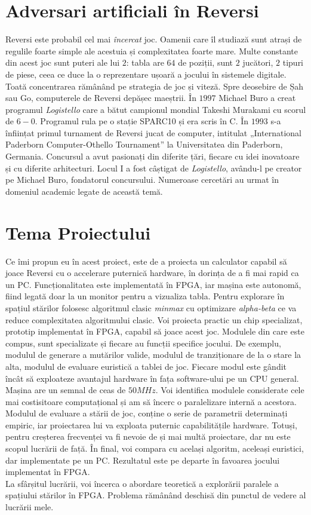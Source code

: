 \documentclass[11pt,twocolumn,a4paper]{article}
\begin{document}
\section*{Adversari artificiali în Reversi}
Reversi este probabil cel mai \emph{încercat} joc. Oamenii care îl studiază sunt atrași de regulile foarte simple ale acestuia și complexitatea foarte mare. Multe constante din acest joc sunt puteri ale lui $2$: tabla are $64$ de poziții, sunt $2$ jucători, $2$ tipuri de piese, ceea ce duce la o reprezentare ușoară a jocului în sistemele digitale. Toată concentrarea rămânând pe strategia de joc și viteză. Spre deosebire de Șah sau Go, computerele de Reversi depășec maeștrii. În $1997$ Michael Buro a creat programul \emph{Logistello} care a bătut campionul mondial Takeshi Murakami cu scorul de $6 - 0$. Programul rula pe o stație SPARC10 și era scris în C. În $1993$ s-a înființat primul turnament de Reversi jucat de computer, intitulat „International Paderborn Computer-Othello Tournament” la Universitatea din Paderborn, Germania. Concursul a avut pasionați din diferite țări, fiecare cu idei inovatoare și cu diferite arhitecturi. Locul I a fost câștigat de \emph{Logistello}, avându-l pe creator pe Michael Buro, fondatorul concursului. Numeroase cercetări au urmat în domeniul academic legate de această temă.\cite{Buro2}\cite{Fang}\cite{Buro3}
\section*{Tema Proiectului}
Ce îmi propun eu în acest proiect, este de a proiecta un calculator capabil să joace Reversi cu o accelerare puternică hardware, în dorința de a fi mai rapid ca un PC. Funcționalitatea este implementată în FPGA, iar mașina este autonomă, fiind legată doar la un monitor pentru a vizualiza tabla. Pentru explorare în spațiul stărilor folosesc algoritmul clasic \emph{minmax} cu optimizare \emph{alpha-beta}\cite{Giumale} ce va reduce complexitatea algoritmului clasic. Voi proiecta practic un chip specializat, prototip implementat în FPGA, capabil să joace acest joc. Modulele din care este compus, sunt specializate și fiecare au funcții specifice jocului. De exemplu, modulul de generare a mutărilor valide, modulul de tranziționare de la o stare la alta, modulul de evaluare euristică a tablei de joc. Fiecare modul este gândit încât să exploateze avantajul hardware în fața software-ului pe un CPU general. Mașina are un semnal de ceas de $50MHz$. Voi identifica modulele considerate cele mai costisitoare computațional și am să încerc o paralelizare internă a acestora. Modulul de evaluare a stării de joc, conține o serie de parametrii determinați empiric, iar proiectarea lui va exploata puternic capabilitățile hardware. Totuși, pentru creșterea frecvenței va fi nevoie de și mai multă proiectare, dar nu este scopul lucrării de față. În final, voi compara cu același algoritm, aceleași euristici, dar implementate pe un PC. Rezultatul este pe departe în favoarea jocului implementat în FPGA.\\
La sfârșitul lucrării, voi încerca o abordare teoretică a explorării paralele a spațiului stărilor în FPGA. Problema rămânând deschisă din punctul de vedere al lucrării mele.\cite{Behrooz}
\end{document}
